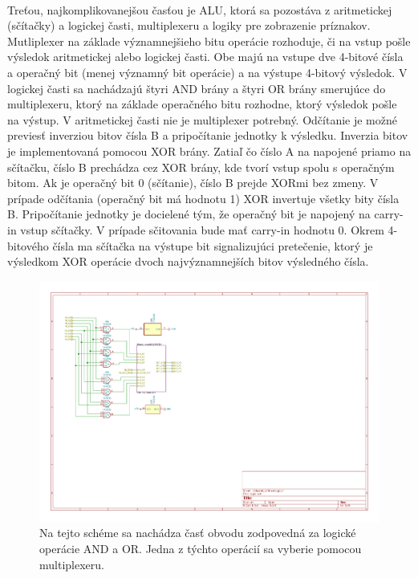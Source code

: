 \documentclass{article}
\begin{document}
    \paragraph{}
    Treťou, najkomplikovanejšou časťou je ALU, ktorá sa pozostáva z aritmetickej (sčítačky) a logickej časti, multiplexeru a logiky pre zobrazenie príznakov. Mutliplexer na základe významnejšieho bitu operácie rozhoduje, či na vstup pošle výsledok aritmetickej alebo logickej časti. Obe majú na vstupe dve 4-bitové čísla a operačný bit (menej významný bit operácie) a na výstupe 4-bitový výsledok. V logickej časti sa nachádzajú štyri AND brány a štyri OR brány smerujúce do multiplexeru, ktorý na základe operačného bitu rozhodne, ktorý výsledok pošle na výstup. V aritmetickej časti nie je multiplexer potrebný. Odčítanie je možné previesť inverziou bitov čísla B a pripočítanie jednotky k výsledku. Inverzia bitov je implementovaná pomocou XOR brány. Zatiaľ čo číslo A na napojené priamo na sčítačku, číslo B prechádza cez XOR brány, kde tvorí vstup spolu s operačným bitom. Ak je operačný bit 0 (sčítanie), číslo B prejde XORmi bez zmeny. V prípade odčítania (operačný bit má hodnotu 1) XOR invertuje všetky bity čísla B. Pripočítanie jednotky je docielené tým, že operačný bit je napojený na carry-in vstup sčítačky. V prípade sčitovania bude mať carry-in hodnotu 0. Okrem 4-bitového čísla ma sčítačka na výstupe bit signalizujúci pretečenie, ktorý je výsledkom XOR operácie dvoch najvýznamnejších bitov výsledného čísla.

    \begin{figure}[h!]
        \centering
        \includegraphics[width=.8\linewidth]{logic_sheet.pdf}
        \caption{Na tejto schéme sa nachádza časť obvodu zodpovedná za logické operácie AND a OR. Jedna z týchto operácií sa vyberie pomocou multiplexeru.}
    \end{figure}
\end{document}

